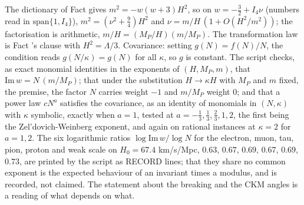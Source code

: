 The dictionary of Fact  gives $m^{2} = -w(w+3)H^{2}$, so on $w = -\tfrac32 + I_4\nu$ (numbers read in $\mathrm{span}\{1, I_4\}$), $m^{2} = (\nu^{2} + \tfrac94)H^{2}$ and $\nu = m/H\,(1 + O(H^{2}/m^{2}))$; the factorisation is arithmetic, $m/H = (M_{P}/H)(m/M_{P})$. The transformation law is Fact 's clause with $H^{2} = \Lambda/3$. Covariance: setting $g(N) = f(N)/N$, the condition reads $g(N/\kappa) = g(N)$ for all $\kappa$, so $g$ is constant. The script checks, as exact monomial identities in the exponents of $(H, M_{P}, m)$, that $\mathrm{Im}\,w = N\,(m/M_{P})$; that under the substitution $H \to \kappa H$ with $M_{P}$ and $m$ fixed, the premise, the factor $N$ carries weight $-1$ and $m/M_{P}$ weight $0$; and that a power law $cN^{a}$ satisfies the covariance, as an identity of monomials in $(N, \kappa)$ with $\kappa$ symbolic, exactly when $a = 1$, tested at $a = -\tfrac13, \tfrac13, \tfrac23, 1, 2$, the first being the Zel'dovich-Weinberg exponent, and again on rational instances at $\kappa = 2$ for $a = 1, 2$. The six logarithmic ratios $\log\mathrm{Im}\,w/\log N$ for the electron, muon, tau, pion, proton and weak scale on $H_{0} = 67.4$ km/s/Mpc, $0.63$, $0.67$, $0.69$, $0.67$, $0.69$, $0.73$, are printed by the script as RECORD lines; that they share no common exponent is the expected behaviour of an invariant times a modulus, and is recorded, not claimed. The statement about the breaking and the CKM angles is a reading of what depends on what.
